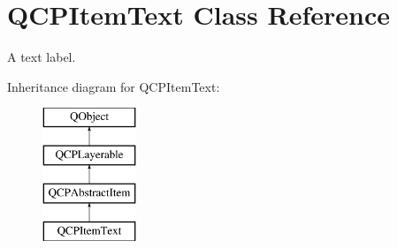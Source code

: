 \hypertarget{class_q_c_p_item_text}{}\section{Q\+C\+P\+Item\+Text Class Reference}
\label{class_q_c_p_item_text}


A text label.  


Inheritance diagram for Q\+C\+P\+Item\+Text\+:\begin{figure}[H]
\begin{center}
\leavevmode
\includegraphics[height=4.000000cm]{class_q_c_p_item_text}
\end{center}
\end{figure}
